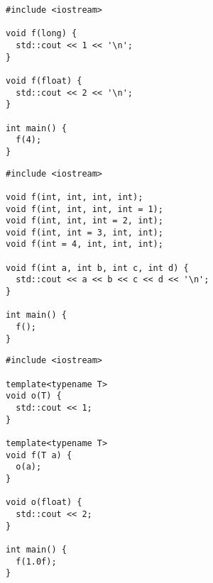 \begin{frame}[fragile]
  \begin{lstlisting}
#include <iostream>

void f(long) {
  std::cout << 1 << '\n';
}

void f(float) {
  std::cout << 2 << '\n';
}

int main() {
  f(4);
}

  \end{lstlisting}
\end{frame}
\begin{frame}[fragile]
  \begin{lstlisting}
#include <iostream>

void f(int, int, int, int);
void f(int, int, int, int = 1);
void f(int, int, int = 2, int);
void f(int, int = 3, int, int);
void f(int = 4, int, int, int);

void f(int a, int b, int c, int d) {
  std::cout << a << b << c << d << '\n';
}

int main() {
  f();
}
  \end{lstlisting}
\end{frame}
\begin{frame}[fragile]
  \begin{lstlisting}
#include <iostream>

template<typename T>
void o(T) {
  std::cout << 1;
}

template<typename T>
void f(T a) {
  o(a);
}

void o(float) {
  std::cout << 2;
}

int main() {
  f(1.0f);
}
  \end{lstlisting}
\end{frame}
